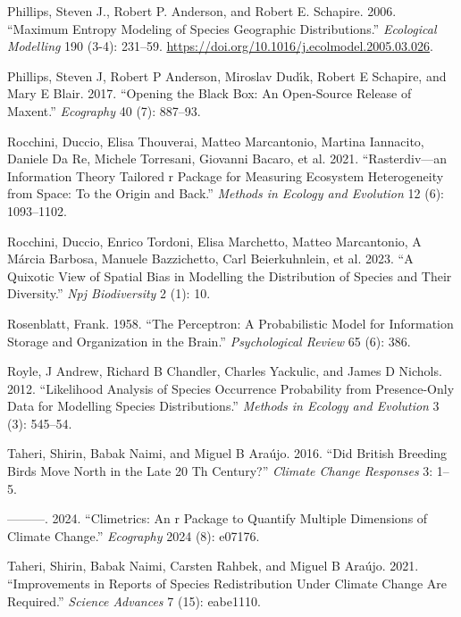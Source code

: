 \documentclass[
]{article}
\newlength{\cslhangindent}
\newenvironment{CSLReferences}[2] %
 {\begin{list}{}{%
  \setlength{\itemindent}{0pt}
  \setlength{\leftmargin}{0pt}
  \setlength{\parsep}{0pt}
  \ifodd #1
   \setlength{\leftmargin}{\cslhangindent}
   \setlength{\itemindent}{-1\cslhangindent}
  \fi
  \setlength{\itemsep}{#2\baselineskip}}}
 {\end{list}}
\begin{document}
\begin{CSLReferences}{1}{0}
Phillips, Steven J., Robert P. Anderson, and Robert E. Schapire. 2006.
{``Maximum Entropy Modeling of Species Geographic Distributions.''}
\emph{Ecological Modelling} 190 (3-4): 231--59.
\url{https://doi.org/10.1016/j.ecolmodel.2005.03.026}.

Phillips, Steven J, Robert P Anderson, Miroslav Dudı́k, Robert E
Schapire, and Mary E Blair. 2017. {``Opening the Black Box: An
Open-Source Release of Maxent.''} \emph{Ecography} 40 (7): 887--93.

Rocchini, Duccio, Elisa Thouverai, Matteo Marcantonio, Martina
Iannacito, Daniele Da Re, Michele Torresani, Giovanni Bacaro, et al.
2021. {``Rasterdiv---an Information Theory Tailored r Package for
Measuring Ecosystem Heterogeneity from Space: To the Origin and Back.''}
\emph{Methods in Ecology and Evolution} 12 (6): 1093--1102.

Rocchini, Duccio, Enrico Tordoni, Elisa Marchetto, Matteo Marcantonio, A
Márcia Barbosa, Manuele Bazzichetto, Carl Beierkuhnlein, et al. 2023.
{``A Quixotic View of Spatial Bias in Modelling the Distribution of
Species and Their Diversity.''} \emph{Npj Biodiversity} 2 (1): 10.

Rosenblatt, Frank. 1958. {``The Perceptron: A Probabilistic Model for
Information Storage and Organization in the Brain.''}
\emph{Psychological Review} 65 (6): 386.

Royle, J Andrew, Richard B Chandler, Charles Yackulic, and James D
Nichols. 2012. {``Likelihood Analysis of Species Occurrence Probability
from Presence-Only Data for Modelling Species Distributions.''}
\emph{Methods in Ecology and Evolution} 3 (3): 545--54.

Taheri, Shirin, Babak Naimi, and Miguel B Araújo. 2016. {``Did British
Breeding Birds Move North in the Late 20 Th Century?''} \emph{Climate
Change Responses} 3: 1--5.

---------. 2024. {``Climetrics: An r Package to Quantify Multiple
Dimensions of Climate Change.''} \emph{Ecography} 2024 (8): e07176.

Taheri, Shirin, Babak Naimi, Carsten Rahbek, and Miguel B Araújo. 2021.
{``Improvements in Reports of Species Redistribution Under Climate
Change Are Required.''} \emph{Science Advances} 7 (15): eabe1110.


\end{CSLReferences}
\end{document}
